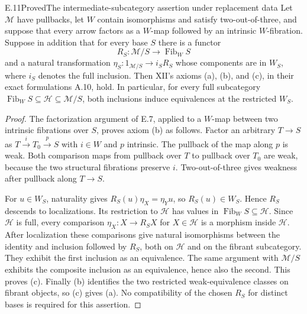 \begin{claim}{E.11}{Proved}{The intermediate-subcategory assertion under replacement data}
Let $\mathcal M$ have pullbacks, let $W$ contain isomorphisms and satisfy two-out-of-three, and suppose that every arrow factors as a $W$-map followed by an intrinsic $W$-fibration. Suppose in addition that for every base $S$ there is a functor
\[
R_S:\mathcal M/S\longrightarrow\operatorname{Fib}_W S
\]
and a natural transformation $\eta_S:1_{\mathcal M/S}\to i_SR_S$ whose components are in $W_S$, where $i_S$ denotes the full inclusion. Then XII's axioms (a), (b), and (c), in their exact formulations A.10, hold. In particular, for every full subcategory
$\operatorname{Fib}_W S\subseteq\mathcal H\subseteq\mathcal M/S$, both inclusions induce equivalences at the restricted $W_S$.
\end{claim}
\begin{proof}
The factorization argument of E.7, applied to a $W$-map between two intrinsic fibrations over $S$, proves axiom (b) as follows. Factor an arbitrary $T\to S$ as $T\xrightarrow{i}T_0\xrightarrow{p}S$ with $i\in W$ and $p$ intrinsic. The pullback of the map along $p$ is weak. Both comparison maps from pullback over $T$ to pullback over $T_0$ are weak, because the two structural fibrations preserve $i$. Two-out-of-three gives weakness after pullback along $T\to S$.

For $u\in W_S$, naturality gives $R_S(u)\eta_X=\eta_Yu$, so $R_S(u)\in W_S$. Hence $R_S$ descends to localizations. Its restriction to $\mathcal H$ has values in $\operatorname{Fib}_W S\subseteq\mathcal H$. Since $\mathcal H$ is full, every comparison $\eta_X:X\to R_SX$ for $X\in\mathcal H$ is a morphism inside $\mathcal H$. After localization these comparisons give natural isomorphisms between the identity and inclusion followed by $R_S$, both on $\mathcal H$ and on the fibrant subcategory. They exhibit the first inclusion as an equivalence. The same argument with $\mathcal M/S$ exhibits the composite inclusion as an equivalence, hence also the second. This proves (c). Finally (b) identifies the two restricted weak-equivalence classes on fibrant objects, so (c) gives (a). No compatibility of the chosen $R_S$ for distinct bases is required for this assertion.
\end{proof}

